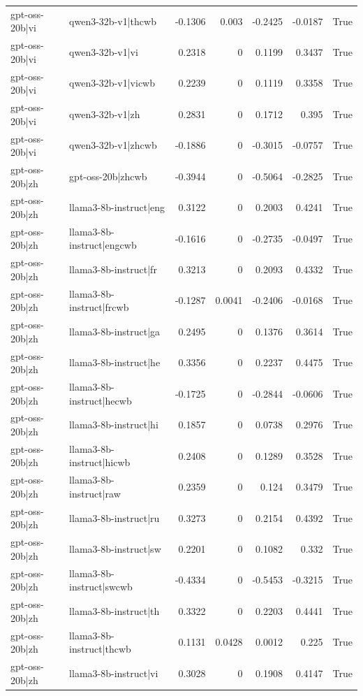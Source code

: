 \begin{table}
\begin{tabular}{l l r r r r l}
gpt-oss-20b|vi & qwen3-32b-v1|thcwb & -0.1306 & 0.003 & -0.2425 & -0.0187 & True \\
gpt-oss-20b|vi & qwen3-32b-v1|vi & 0.2318 & 0 & 0.1199 & 0.3437 & True \\
gpt-oss-20b|vi & qwen3-32b-v1|vicwb & 0.2239 & 0 & 0.1119 & 0.3358 & True \\
gpt-oss-20b|vi & qwen3-32b-v1|zh & 0.2831 & 0 & 0.1712 & 0.395 & True \\
gpt-oss-20b|vi & qwen3-32b-v1|zhcwb & -0.1886 & 0 & -0.3015 & -0.0757 & True \\
gpt-oss-20b|zh & gpt-oss-20b|zhcwb & -0.3944 & 0 & -0.5064 & -0.2825 & True \\
gpt-oss-20b|zh & llama3-8b-instruct|eng & 0.3122 & 0 & 0.2003 & 0.4241 & True \\
gpt-oss-20b|zh & llama3-8b-instruct|engcwb & -0.1616 & 0 & -0.2735 & -0.0497 & True \\
gpt-oss-20b|zh & llama3-8b-instruct|fr & 0.3213 & 0 & 0.2093 & 0.4332 & True \\
gpt-oss-20b|zh & llama3-8b-instruct|frcwb & -0.1287 & 0.0041 & -0.2406 & -0.0168 & True \\
gpt-oss-20b|zh & llama3-8b-instruct|ga & 0.2495 & 0 & 0.1376 & 0.3614 & True \\
gpt-oss-20b|zh & llama3-8b-instruct|he & 0.3356 & 0 & 0.2237 & 0.4475 & True \\
gpt-oss-20b|zh & llama3-8b-instruct|hecwb & -0.1725 & 0 & -0.2844 & -0.0606 & True \\
gpt-oss-20b|zh & llama3-8b-instruct|hi & 0.1857 & 0 & 0.0738 & 0.2976 & True \\
gpt-oss-20b|zh & llama3-8b-instruct|hicwb & 0.2408 & 0 & 0.1289 & 0.3528 & True \\
gpt-oss-20b|zh & llama3-8b-instruct|raw & 0.2359 & 0 & 0.124 & 0.3479 & True \\
gpt-oss-20b|zh & llama3-8b-instruct|ru & 0.3273 & 0 & 0.2154 & 0.4392 & True \\
gpt-oss-20b|zh & llama3-8b-instruct|sw & 0.2201 & 0 & 0.1082 & 0.332 & True \\
gpt-oss-20b|zh & llama3-8b-instruct|swcwb & -0.4334 & 0 & -0.5453 & -0.3215 & True \\
gpt-oss-20b|zh & llama3-8b-instruct|th & 0.3322 & 0 & 0.2203 & 0.4441 & True \\
gpt-oss-20b|zh & llama3-8b-instruct|thcwb & 0.1131 & 0.0428 & 0.0012 & 0.225 & True \\
gpt-oss-20b|zh & llama3-8b-instruct|vi & 0.3028 & 0 & 0.1908 & 0.4147 & True \\

\end{tabular}
\end{table}
